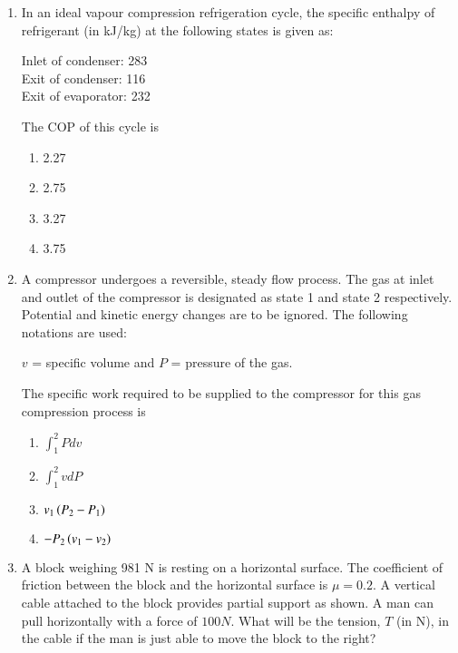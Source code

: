 \documentclass[journal]{IEEEtran}
\begin{document}
\begin{enumerate}
    \item In an ideal vapour compression refrigeration cycle, the specific
    enthalpy of refrigerant (in kJ/kg) at the following states is given as:
    
    Inlet of condenser: 283 \\
    Exit of condenser: 116 \\
    Exit of evaporator: 232

    The COP of this cycle is
    \begin{multicols}{4}
    \begin{enumerate}
        \item 2.27
        \item 2.75
        \item 3.27
        \item 3.75
    \end{enumerate}
    \end{multicols}

    \item A compressor undergoes a reversible, steady flow process. The gas
    at inlet and outlet of the compressor is designated as state 1 and state
    2 respectively. Potential and kinetic energy changes are to be ignored.
    The following notations are used:
    
    $v$ = specific volume and $P$ = pressure of the gas.
    
    The specific work required to be supplied to the compressor for this gas
    compression process is 
    \begin{multicols}{4}
    \begin{enumerate}
    \item $\int_{1}^{2} Pdv$
    \item $\int_{1}^{2} vdP$
    \item $v_1\left(P_2 - P_1\right)$
    \item $-P_2\left(v_1 - v_2\right)$
    \end{enumerate}
    \end{multicols}

    \item A block weighing 981 N is resting on a horizontal surface. The coefficient
    of friction between the block and the horizontal surface is $\mu = 0.2$. A vertical
    cable attached to the block provides partial support as shown. A man can pull
    horizontally with a force of $100 N$. What will be the tension, $T$ (in N), in the
    cable if the man is just able to move the block to the right?
    

\end{enumerate}
\end{document}
